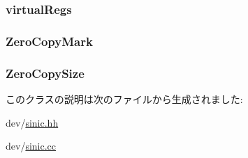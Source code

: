 \label{classSinic_1_1Device_a8e55d9d438f57f1cf9bee803876daf7e}
\hypertarget{classSinic_1_1Device_acb438fcaae56ab29f35376e8b0726c23}{
\subsubsection[{virtualRegs}]{ {\bf virtualRegs}}}
\label{classSinic_1_1Device_acb438fcaae56ab29f35376e8b0726c23}
\hypertarget{classSinic_1_1Device_a93d85f8e9d6efa8d85cce98ef514c54d}{
\subsubsection[{ZeroCopyMark}]{ {\bf ZeroCopyMark}}}
\label{classSinic_1_1Device_a93d85f8e9d6efa8d85cce98ef514c54d}
\hypertarget{classSinic_1_1Device_a0a6cb3337e941db43aff26f90444592a}{
\subsubsection[{ZeroCopySize}]{ {\bf ZeroCopySize}}}
\label{classSinic_1_1Device_a0a6cb3337e941db43aff26f90444592a}


このクラスの説明は次のファイルから生成されました:\begin{DoxyCompactItemize}
\item 
dev/\hyperlink{sinic_8hh}{sinic.hh}\item 
dev/\hyperlink{sinic_8cc}{sinic.cc}\end{DoxyCompactItemize}
